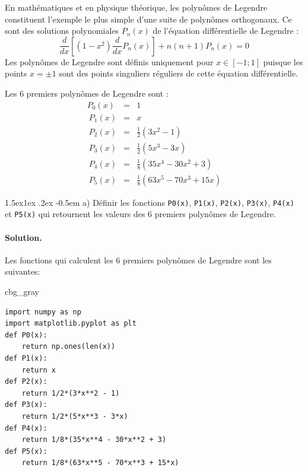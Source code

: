 \documentclass[%
oneside,                 %
final,                   %
10pt,french]{article}
\makeatletter
\newenvironment{_cod_tight}[1]{
   \def\FrameCommand{\colorbox{#1}}
   \FrameRule0.6pt\MakeFramed {\FrameRestore}\vskip3mm}
   {\vskip0mm\endMakeFramed}
\newenvironment{cod}[1]{
\bgroup\rmfamily
\fboxsep=0mm\relax
\begin{_cod_tight}{#1}
\list{}{\parsep=-2mm\parskip=0mm\topsep=0pt\leftmargin=2mm
\rightmargin=2\leftmargin\leftmargin=4pt\relax}
\item\relax}
{\endlist\end{_cod_tight}\egroup}
\newenvironment{doconceexercise}{}{}
\newcounter{doconceexercisecounter}
\newcommand\subex{\@startsection{paragraph}{4}{\z@}%
                  {1.5ex\@plus1ex \@minus.2ex}%
                  {-0.5em}%
                  {\normalfont\normalsize\bfseries}}
\makeatother
\begin{document}
\begin{doconceexercise}



En mathématiques et en physique théorique, les polynômes de Legendre constituent l'exemple le plus simple d'une suite de polynômes orthogonaux. Ce sont des solutions polynomiales $P_n(x)$ de l'équation différentielle de Legendre :
\begin{equation*}
\frac{d}{d x}\left[(1-x^{2}){\frac {d }{d x}}P_{n}(x) \right]+ n(n+1) P_{n}(x)=0
\end{equation*}
Les polynômes de Legendre sont définis uniquement pour $x \in [-1 ; 1]$ puisque les points $x = \pm 1$ sont des points singuliers réguliers de cette équation différentielle.

Les 6 premiers polynômes de Legendre sont :
\begin{eqnarray*}
P_{0}(x)&=&1 \\\
P_{1}(x)&=&x \\\
P_{2}(x)&=&\frac{1}{2}(3x^{2}-1)\\\
P_{3}(x)&=&\frac{1}{2}(5x^{3}-3x)\\\
P_{4}(x)&=&\frac{1}{8}(35x^{4}-30x^{2}+3)\\\
P_{5}(x)&=&\frac{1}{8}(63x^{5}-70x^{3}+15x)
\end{eqnarray*}


\subex{a)}
Définir les fonctions \texttt{P0(x)}, \texttt{P1(x)}, \texttt{P2(x)}, \texttt{P3(x)}, \texttt{P4(x)} et \texttt{P5(x)} qui retournent les valeurs des 6 premiers polynômes de Legendre.


\paragraph{Solution.}
Les fonctions qui calculent les 6 premiers polynômes de Legendre sont les suivantes:
\begin{cod}{cbg_gray}\begin{verbatim}
import numpy as np
import matplotlib.pyplot as plt
def P0(x):
    return np.ones(len(x))
def P1(x):
    return x
def P2(x):
    return 1/2*(3*x**2 - 1)
def P3(x):
    return 1/2*(5*x**3 - 3*x)
def P4(x):
    return 1/8*(35*x**4 - 30*x**2 + 3)
def P5(x):
    return 1/8*(63*x**5 - 70*x**3 + 15*x)
\end{verbatim}
\end{cod}
\noindent


\end{doconceexercise}
\end{document}
